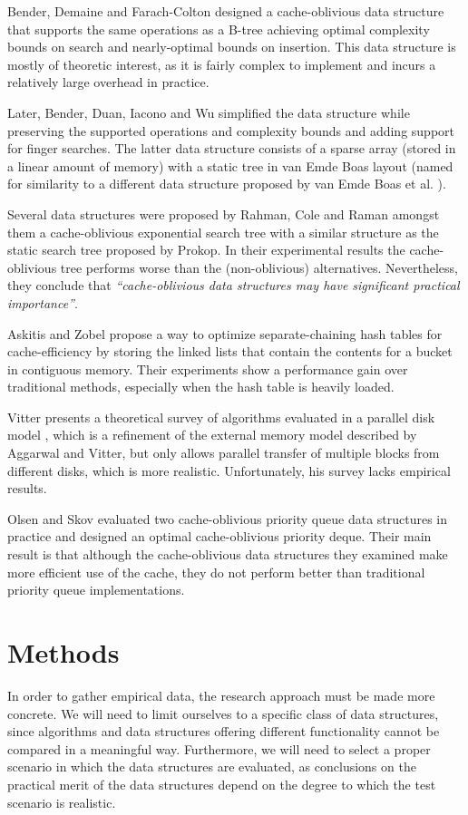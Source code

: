 \documentclass{acm_proc_article-sp}
\begin{document}
Bender, Demaine and Farach-Colton designed a cache-oblivious data structure that supports the same operations as a B-tree \cite{bender2005cob} achieving optimal complexity bounds on search and nearly-optimal bounds on insertion. This data structure is mostly of theoretic interest, as it is fairly complex to implement and incurs a relatively large overhead in practice.

Later, Bender, Duan, Iacono and Wu simplified the data structure \cite{bender2004lpc} while preserving the supported operations and complexity bounds and adding support for finger searches. The latter data structure consists of a sparse array (stored in a linear amount of memory) with a static tree in van Emde Boas layout (named for similarity to a different data structure proposed by van Emde Boas et al. \cite{vanemdeboas1976dai}).

Several data structures were proposed by Rahman, Cole and Raman \cite{rahman2001opd} amongst them a cache-oblivious exponential search tree with a similar structure as the static search tree proposed by Prokop. In their experimental results the cache-oblivious tree performs worse than the (non-oblivious) alternatives. Nevertheless, they conclude that \textit{``cache-obli\-vious data structures may have significant practical importance''}.

Askitis and Zobel \cite{askitis2005ccc} propose a way to optimize separate-chaining hash tables for cache-efficiency by storing the linked lists that contain the contents for a bucket in contiguous memory. Their experiments show a performance gain over traditional methods, especially when the hash table is heavily loaded.

Vitter presents a theoretical survey of algorithms evaluated in a parallel disk model \cite{vitter2001ema}, which is a refinement of the external memory model described by Aggarwal and Vitter, but only allows parallel transfer of multiple blocks from different disks, which is more realistic. Unfortunately, his survey lacks empirical results.

Olsen and Skov evaluated two cache-oblivious priority queue data structures in practice \cite{olsen2002coa} and designed an optimal cache-obli\-vious priority deque. Their main result is that although the cache-obli\-vious data structures they examined make more efficient use of the cache, they do not perform better than traditional priority queue implementations.

\section{Methods}
In order to gather empirical data, the research approach must be made more concrete. We will need to limit ourselves to a specific class of data structures, since algorithms and data structures offering different functionality cannot be compared in a meaningful way. Furthermore, we will need to select a proper scenario in which the data structures are evaluated, as conclusions on the practical merit of the data structures depend on the degree to which the test scenario is realistic.
\end{document}
